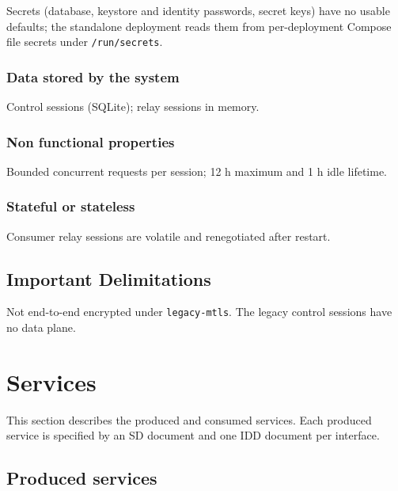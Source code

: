 \documentclass[a4paper]{arrowhead}
\begin{document}
Secrets (database, keystore and identity passwords, secret keys) have no usable defaults; the standalone deployment reads them from per-deployment Compose file secrets under \texttt{/\allowbreak{}run/\allowbreak{}secrets}.

\subsubsection{Data stored by the system}

Control sessions (SQLite); relay sessions in memory.

\subsubsection{Non functional properties}

Bounded concurrent requests per session; 12 h maximum and 1 h idle lifetime.

\subsubsection{Stateful or stateless}

Consumer relay sessions are volatile and renegotiated after restart.

\subsection{Important Delimitations}
\label{sec:delimitations}

Not end-to-end encrypted under \texttt{legacy-\allowbreak{}mtls}. The legacy control sessions have no data plane.

\newpage

\section{Services}
\label{sec:services}

This section describes the produced and consumed services. Each produced service is specified by an SD document and one IDD document per interface.

\subsection{Produced services}
\end{document}

